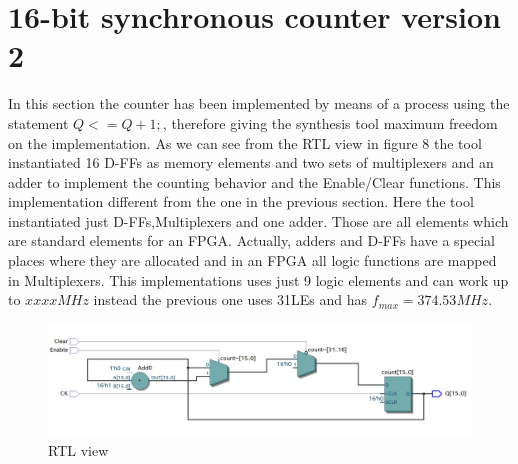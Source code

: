 \documentclass[12pt]{article}
\begin{document}
\section{16-bit synchronous counter version 2}
In this section the counter has been implemented by means of a process using the statement $Q<=Q+1;$, therefore giving the synthesis tool maximum freedom on the implementation. As we can see from the RTL view in figure $8$ the tool instantiated 16 D-FFs as memory elements and two sets of multiplexers and an adder to implement the counting behavior and the Enable/Clear functions. This implementation different from the one in the previous section. Here the tool instantiated just D-FFs,Multiplexers and one adder. Those are all elements which are standard elements for an FPGA. Actually, adders and D-FFs have a special places where they are allocated and in an FPGA all logic functions are mapped in Multiplexers. This implementations uses just 9 logic elements and can work up to $xxxxMHz$ instead the previous one uses 31LEs and has $f_{max}=374.53MHz$.
\begin{figure}[h]
	\centering
	\includegraphics[scale = 0.6]{immagini/RTB3.jpg}
	\caption{RTL view}
\end{figure}
\end{document}
